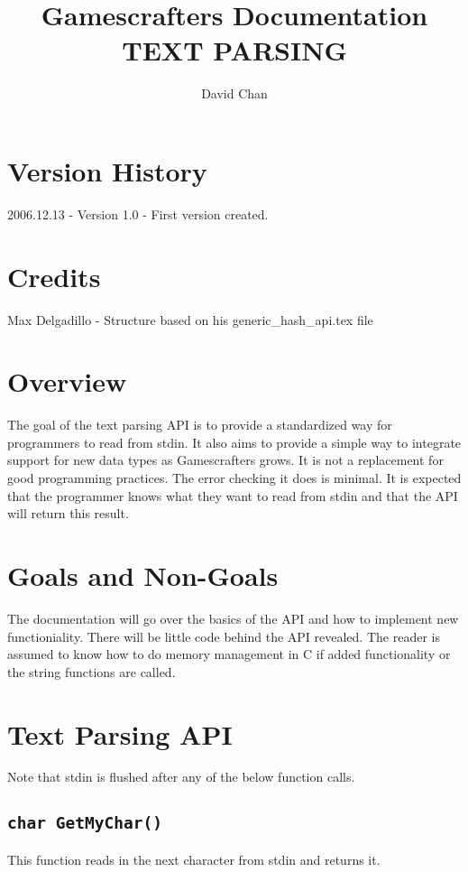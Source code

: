 \documentclass[11pt]{article}
\begin{document}
\title{Gamescrafters Documentation\\
TEXT PARSING}
\author{David Chan}
\date{}
\maketitle

\section*{Version History}
2006.12.13 - Version 1.0 - First version created.

\section*{Credits}
Max Delgadillo - Structure based on his generic\_hash\_api.tex file

\tableofcontents
\newpage

\section{Overview}
The goal of the text parsing API is to provide a standardized way for programmers to read from stdin. It also aims to provide a simple way to integrate support for new data types as Gamescrafters grows. It is not a replacement for good programming practices. The error checking it does is minimal. It is expected that the programmer knows what they want to read from stdin and that the API will return this result. 

\section{Goals and Non-Goals}
The documentation will go over the basics of the API and how to implement new functioniality. There will be little code behind the API revealed. The reader is assumed to know how to do memory management in C if added functionality or the string functions are called. 

\section{Text Parsing API}

Note that stdin is flushed after any of the below function calls.

\subsection{\texttt{char GetMyChar()}}
This function reads in the next character from stdin and returns it.
\end{document}
